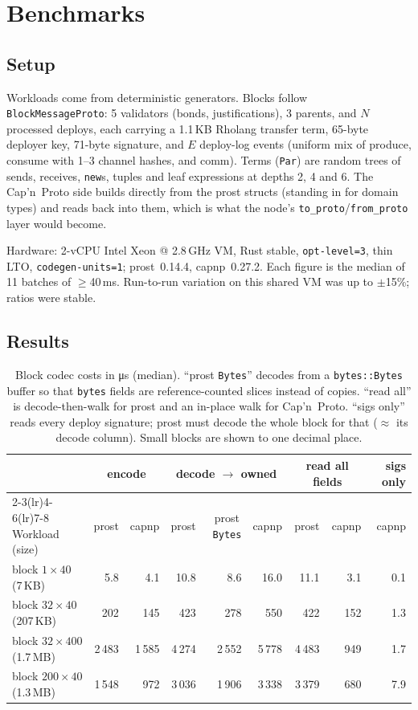 \documentclass[10pt,a4paper]{article}
\newcommand{\f}[1]{\nolinkurl{#1}}
\newcommand{\capnp}{Cap'n~Proto}
\begin{document}
\section{Benchmarks}\label{sec:benchmarks}

\subsection{Setup}
Workloads come from deterministic generators. Blocks follow \f{BlockMessageProto}: 5 validators
(bonds, justifications), 3 parents, and $N$ processed deploys, each carrying a 1.1\,KB Rholang
transfer term, 65-byte deployer key, 71-byte signature, and $E$ deploy-log events (uniform mix
of produce, consume with 1--3 channel hashes, and comm). Terms (\f{Par}) are random trees of
sends, receives, \f{new}s, tuples and leaf expressions at depths 2, 4 and 6. The \capnp{} side
builds directly from the prost structs (standing in for domain types) and reads back into them,
which is what the node's \f{to_proto}/\f{from_proto} layer would become.

Hardware: 2-vCPU Intel Xeon @ 2.8\,GHz VM, Rust stable, \f{opt-level=3}, thin LTO,
\f{codegen-units=1}; prost~0.14.4, capnp~0.27.2. Each figure is the median of 11 batches of
$\geq$40\,ms. Run-to-run variation on this shared VM was up to $\pm$15\%; ratios were stable.

\subsection{Results}

\begin{table}[h]
\centering\small
\begin{tabular}{@{}lrrrrrrrr@{}}
\toprule
& \multicolumn{2}{c}{encode} & \multicolumn{3}{c}{decode $\to$ owned} & \multicolumn{2}{c}{read all fields} & {sigs only} \\
\cmidrule(lr){2-3}\cmidrule(lr){4-6}\cmidrule(lr){7-8}
Workload (size) & prost & capnp & prost & prost\,\f{Bytes} & capnp & prost & capnp & capnp \\
\midrule
block $1{\times}40$ \hfill(7\,KB)   & 5.8 & 4.1 & 10.8 & 8.6 & 16.0 & 11.1 & 3.1 & 0.1 \\
block $32{\times}40$ \hfill(207\,KB) & 202 & 145 & 423 & 278 & 550 & 422 & 152 & 1.3 \\
block $32{\times}400$ \hfill(1.7\,MB) & 2\,483 & 1\,585 & 4\,274 & 2\,552 & 5\,778 & 4\,483 & 949 & 1.7 \\
block $200{\times}40$ \hfill(1.3\,MB) & 1\,548 & 972 & 3\,036 & 1\,906 & 3\,338 & 3\,379 & 680 & 7.9 \\
\bottomrule
\end{tabular}
\caption{Block codec costs in \si{\micro\second} (median). ``prost \f{Bytes}'' decodes from a
\f{bytes::Bytes} buffer so that \f{bytes} fields are reference-counted slices instead of copies.
``read all'' is decode-then-walk for prost and an in-place walk for \capnp{}. ``sigs only'' reads
every deploy signature; prost must decode the whole block for that ($\approx$ its decode column).
Small blocks are shown to one decimal place.}
\label{tab:blocks}
\end{table}
\end{document}

